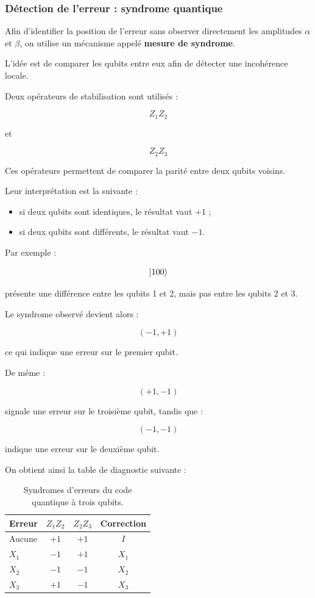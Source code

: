 \documentclass[a4paper,12pt]{article}
\begin{document}
\subsubsection{Détection de l’erreur : syndrome quantique}

Afin d’identifier la position de l’erreur sans observer directement les amplitudes $\alpha$ et $\beta$, on utilise un mécanisme appelé \textbf{mesure de syndrome}.

L’idée est de comparer les qubits entre eux afin de détecter une incohérence locale.

Deux opérateurs de stabilisation sont utilisés :

\[
Z_1Z_2
\]

et

\[
Z_2Z_3
\]

Ces opérateurs permettent de comparer la parité entre deux qubits voisins.

Leur interprétation est la suivante :

\begin{itemize}
    \item si deux qubits sont identiques, le résultat vaut $+1$ ;
    \item si deux qubits sont différents, le résultat vaut $-1$.
\end{itemize}

Par exemple :

\[
\ket{100}
\]

présente une différence entre les qubits 1 et 2, mais pas entre les qubits 2 et 3.

Le syndrome observé devient alors :

\[
(-1,+1)
\]

ce qui indique une erreur sur le premier qubit.

De même :

\[
(+1,-1)
\]

signale une erreur sur le troisième qubit, tandis que :

\[
(-1,-1)
\]

indique une erreur sur le deuxième qubit.

On obtient ainsi la table de diagnostic suivante :

\begin{table}[h!]
\centering
\begin{tabular}{lccc}
\hline
Erreur & $Z_1Z_2$ & $Z_2Z_3$ & Correction \\ \hline
Aucune & $+1$ & $+1$ & $I$ \\
$X_1$ & $-1$ & $+1$ & $X_1$ \\
$X_2$ & $-1$ & $-1$ & $X_2$ \\
$X_3$ & $+1$ & $-1$ & $X_3$ \\ \hline
\end{tabular}
\caption{Syndromes d’erreurs du code quantique à trois qubits.}
\end{table}
\end{document}
